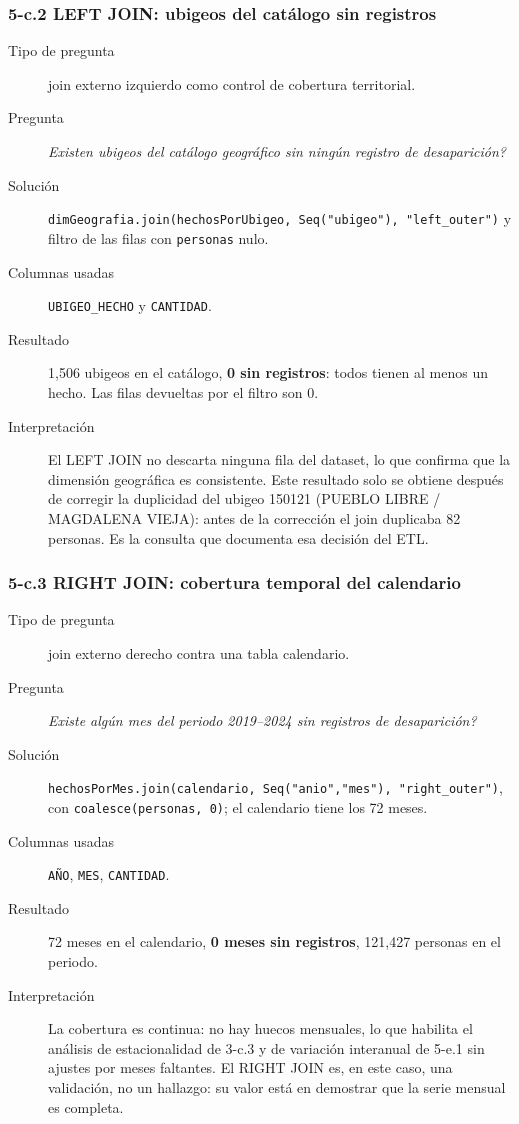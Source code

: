\subsubsection*{5-c.2 \textbar{} LEFT JOIN: ubigeos del cat\'alogo sin registros}
\begin{description}
\item[Tipo de pregunta] join externo izquierdo como control de cobertura territorial.
\item[Pregunta] \emph{Existen ubigeos del cat\'alogo geogr\'afico sin ning\'un registro de
      desaparici\'on?}
\item[Soluci\'on] \texttt{dimGeografia.join(hechosPorUbigeo, Seq("ubigeo"), "left\_outer")} y
      filtro de las filas con \texttt{personas} nulo.
\item[Columnas usadas] \texttt{UBIGEO\_HECHO} y \texttt{CANTIDAD}.
\item[Resultado] 1,506 ubigeos en el cat\'alogo, \textbf{0 sin registros}: todos tienen al menos
      un hecho. Las filas devueltas por el filtro son 0.
\item[Interpretaci\'on] El LEFT JOIN no descarta ninguna fila del dataset, lo que confirma que la
      dimensi\'on geogr\'afica es consistente. Este resultado solo se obtiene despu\'es de
      corregir la duplicidad del ubigeo 150121 (PUEBLO LIBRE / MAGDALENA VIEJA): antes de la
      correcci\'on el join duplicaba 82 personas. Es la consulta que documenta esa decisi\'on del
      ETL.
\end{description}

\subsubsection*{5-c.3 \textbar{} RIGHT JOIN: cobertura temporal del calendario}
\begin{description}
\item[Tipo de pregunta] join externo derecho contra una tabla calendario.
\item[Pregunta] \emph{Existe alg\'un mes del periodo 2019--2024 sin registros de desaparici\'on?}
\item[Soluci\'on] \texttt{hechosPorMes.join(calendario, Seq("anio","mes"), "right\_outer")},
      con \texttt{coalesce(personas, 0)}; el calendario tiene los 72 meses.
\item[Columnas usadas] \texttt{A\~NO}, \texttt{MES}, \texttt{CANTIDAD}.
\item[Resultado] 72 meses en el calendario, \textbf{0 meses sin registros}, 121,427 personas en el
      periodo.
\item[Interpretaci\'on] La cobertura es continua: no hay huecos mensuales, lo que habilita el
      an\'alisis de estacionalidad de 3-c.3 y de variaci\'on interanual de 5-e.1 sin ajustes por
      meses faltantes. El RIGHT JOIN es, en este caso, una validaci\'on, no un hallazgo: su valor
      est\'a en demostrar que la serie mensual es completa.
\end{description}

